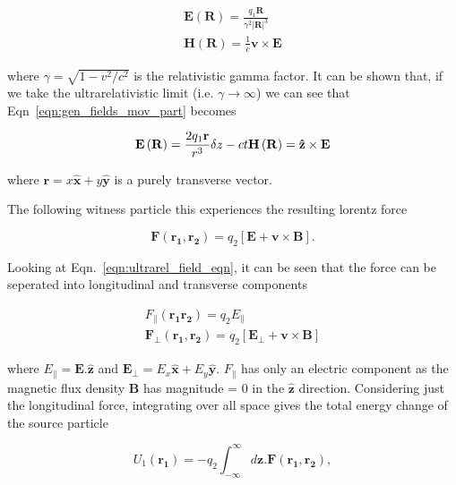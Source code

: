 \begin{align}
\mathbf{E}\left( \mathbf{R}  \right) = \frac{q_{1}\mathbf{R}}{\gamma^{2}\left| \mathbf{R} \right|^{3}} \\
\mathbf{H}\left( \mathbf{R}  \right) = \frac{1}{c}\mathbf{v} \times \mathbf{E}
\label{eqn:gen_fields_mov_part}
\end{align}

where $\gamma = \sqrt{1- v^{2}/c^{2}}$ is the relativistic gamma factor. It can be shown that, if we take the ultrarelativistic limit (i.e. $\gamma \rightarrow \infty$) we can see that Eqn~\ref{eqn:gen_fields_mov_part} becomes

\begin{equation}
\mathbf{E}\left( \mathbf{R}  \right) = \frac{2q_{1}\mathbf{r}}{r^{3}}\delta{z-ct} \\
\mathbf{H}\left( \mathbf{R}  \right) = \mathbf{\hat{z}} \times \mathbf{E}
\label{eqn:ultrarel_field_eqn}
\end{equation}

where $\mathbf{r} = x\mathbf{\hat{x}} + y\mathbf{\hat{y}}$ is a purely transverse vector.

The following witness particle this experiences the resulting lorentz force 

\begin{equation}
\mathbf{F}\left(\mathbf{r_{1}}, \mathbf{r_{2}}  \right) = q_{2}\left[ \mathbf{E} + \mathbf{v} \times \mathbf{B}  \right]. 
\end{equation}

Looking at Eqn.~\ref{eqn:ultrarel_field_eqn}, it can be seen that the force can be seperated into longitudinal and transverse components 

\begin{align}
F_{\parallel}\left(\mathbf{r_{1}} \mathbf{r_{2}}  \right) = q_{2}E_{\parallel} \\
\mathbf{F_{\perp}}\left(\mathbf{r_{1}}, \mathbf{r_{2}}  \right)  = q_{2}\left[ \mathbf{E_{\perp}} + \mathbf{v} \times \mathbf{B} \right]
\end{align}

where $E_{\parallel} = \mathbf{E}.\mathbf{\hat{z}}$ and $\mathbf{E_{\perp}} = E_{x}\mathbf{\hat{x}} + E_{y}\mathbf{\hat{y}}$. $F_{\parallel}$ has only an electric component as the magnetic flux density $\mathbf{B}$ has magnitude = 0 in the $\mathbf{\hat{z}}$ direction. Considering just the longitudinal force, integrating over all space gives the total energy change of the source particle

\begin{equation}
U_{1}\left(\mathbf{r_{1}}  \right) = -q_{2} \int^{\infty}_{-\infty} d\mathbf{z} . \mathbf{F}\left(\mathbf{r_{1}}, \mathbf{r_{2}}  \right),
\end{equation}

